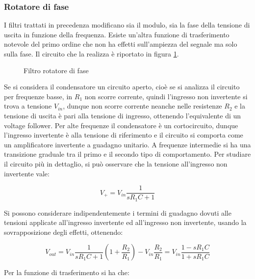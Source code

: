 \documentclass[../main.tex]{subfiles}
\begin{document}
\subsubsection{Rotatore di fase}

I filtri trattati in precedenza modificano sia il modulo, sia la fase della tensione di uscita in funzione della frequenza. Esiste un’altra funzione di trasferimento notevole del primo ordine che non ha effetti sull’ampiezza del segnale ma solo sulla fase. Il circuito che la realizza è riportato in figura \ref{filtri12}.

\begin{figure}
\begin{center}


\label{filtri12}
\caption{Filtro rotatore di fase}	
\end{center}	
\end{figure}

Se si considera il condensatore un circuito aperto, cioè se si analizza il circuito per frequenze basse, in $R_1$ non scorre corrente, quindi l’ingresso non invertente si trova a tensione $V_{in}$, dunque non scorre corrente neanche nelle resistenze $R_2$ e la tensione di uscita è pari alla tensione di ingresso, ottenendo l’equivalente di un voltage follower. Per alte frequenze il condensatore è un cortocircuito, dunque l’ingresso invertente è alla tensione di riferimento e il circuito si comporta come un amplificatore invertente a guadagno unitario. 
A frequenze intermedie si ha una transizione graduale tra il primo e il secondo tipo di comportamento. Per studiare il circuito più in dettaglio, si può osservare che la tensione all’ingresso non invertente vale:

\begin{equation}
	V_+ = V_{in} \frac{1}{sR_1C + 1}
\end{equation}

Si possono considerare indipendentemente i termini di guadagno dovuti alle tensioni applicate all’ingresso invertente ed all’ingresso non invertente, usando la sovrapposizione degli effetti, ottenendo:


\begin{equation}
	V_{out} = V_{in} \frac{1}{sR_1C + 1} \left( 1 + \frac{R_2}{R_1} \right) - V_{in} \frac{R_2}{R_1} = V_{in} \frac{1 - sR_1C}{1 + sR_1C}
\end{equation}

Per la funzione di trasferimento si ha che:
\end{document}
